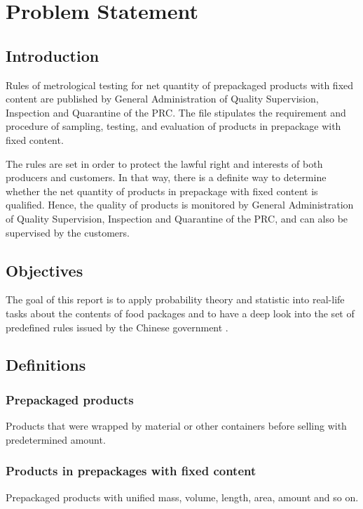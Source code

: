 \documentclass[conf]{new-aiaa}
\begin{document}
\newpage

\section{Problem Statement}

\subsection{Introduction}

Rules of metrological testing for net quantity of prepackaged products with fixed content are published by General Administration of Quality Supervision, Inspection and Quarantine of the PRC. The file stipulates the requirement and procedure of sampling, testing, and evaluation of products in prepackage with fixed content. \medskip

The rules are set in order to protect the lawful right and interests of both producers and customers. In that way, there is a definite way to determine whether the net quantity of products in prepackage with fixed content is qualified. Hence, the quality of products is monitored by General Administration of Quality Supervision, Inspection and Quarantine of the PRC, and can also be supervised by the customers. 

\subsection{Objectives}

The goal of this report is to apply probability theory and statistic into real-life tasks about the contents of food packages and to have a deep look into the set of predefined rules issued by the Chinese government \cite{GBT}.

\subsection{Definitions}

\subsubsection*{Prepackaged products}
Products that were wrapped by material or other containers before selling with predetermined amount.

\subsubsection*{Products in prepackages with fixed content}
Prepackaged products with unified mass, volume, length, area, amount and so on.
\end{document}
